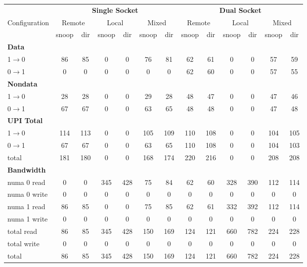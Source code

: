\begin{table}[t] \centering \small \setlength{\tabcolsep}{5pt}
\renewcommand{\arraystretch}{1.2}

\begin{tabular}{|l|cc|cc|cc||cc|cc|cc|}
\hline

& \multicolumn{6}{c||}{\textbf{Single Socket}}
& \multicolumn{6}{c|}{\textbf{Dual Socket}} \\
\cline{2-13}

Configuration &
\multicolumn{2}{c|}{Remote} &
\multicolumn{2}{c|}{Local} &
\multicolumn{2}{c||}{Mixed} &
\multicolumn{2}{c|}{Remote} &
\multicolumn{2}{c|}{Local} &
\multicolumn{2}{c|}{Mixed} \\
\hline

& snoop & dir
& snoop & dir
& snoop & dir
& snoop & dir
& snoop & dir
& snoop & dir \\
\hline\hline

\multicolumn{13}{|l|}{\textbf{Data}} \\
\hline
1$\rightarrow$0 & 86 & 85 & 0 & 0 & 76 & 81 & 62 & 61 & 0 & 0 & 57 & 59 \\
\hline
0$\rightarrow$1 & 0 & 0 & 0 & 0 & 0 & 0 & 62 & 60 & 0 & 0 & 57 & 55 \\
\hline

\multicolumn{13}{|l|}{\textbf{Nondata}} \\
\hline
1$\rightarrow$0 & 28 & 28 & 0 & 0 & 29 & 28 & 48 & 47 & 0 & 0 & 47 & 46 \\
\hline
0$\rightarrow$1 & 67 & 67 & 0 & 0 & 63 & 65 & 48 & 48 & 0 & 0 & 47 & 48 \\
\hline

\multicolumn{13}{|l|}{\textbf{UPI Total}} \\
\hline
1$\rightarrow$0 & 114 & 113 & 0 & 0 & 105 & 109 & 110 & 108 & 0 & 0 & 104 & 105 \\
\hline
0$\rightarrow$1 & 67 & 67 & 0 & 0 & 63 & 65 & 110 & 108 & 0 & 0 & 104 & 103 \\
\hline
total           & 181 & 180 & 0 & 0 & 168 & 174 & 220 & 216 & 0 & 0 & 208 & 208 \\
\hline

\multicolumn{13}{|l|}{\textbf{Bandwidth}} \\
\hline
numa 0 read     & 0 & 0 & 345 & 428 & 75 & 84 & 62 & 60 & 328 & 390 & 112 & 114 \\
\hline
numa 0 write    & 0 & 0 & 0 & 0 & 0 & 0 & 0 & 0 & 0 & 0 & 0 & 0 \\
\hline
numa 1 read     & 86 & 85 & 0 & 0 & 75 & 85 & 62 & 61 & 332 & 392 & 112 & 114 \\
\hline
numa 1 write    & 0 & 0 & 0 & 0 & 0 & 0 & 0 & 0 & 0 & 0 & 0 & 0 \\
\hline
total read      & 86 & 85 & 345 & 428 & 150 & 169 & 124 & 121 & 660 & 782 & 224 & 228 \\
\hline
total write     & 0 & 0 & 0 & 0 & 0 & 0 & 0 & 0 & 0 & 0 & 0 & 0 \\
\hline
total           & 86 & 85 & 345 & 428 & 150 & 169 & 124 & 121 & 660 & 782 & 224 & 228 \\
\hline


\end{tabular}
\end{table}
